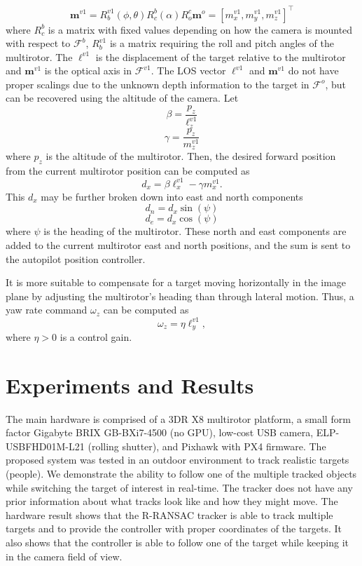 \documentclass[letterpaper, 10 pt, conference]{ieeeconf}  %
\begin{document}
\begin{equation}
\mathbf{m}^{v1}=R^{v1}_b(\phi,\theta)R^b_c(\alpha)R^c_o\mathbf{m}^o=[m^{v1}_x, m^{v1}_y, m^{v1}_z]^\top
\end{equation} where $R^b_c$ is a matrix with fixed values depending on how the camera is mounted with respect to $\mathcal{F}^b$, $R^{v1}_b$ is a matrix requiring the roll and pitch angles of the multirotor. The $\ell^{v1}$ is the displacement of the target relative to the multirotor and $\mathbf{m}^{v1}$ is the optical axis in $\mathcal{F}^{v1}$. The LOS vector $\ell^{v1}$ and $\mathbf{m}^{v1}$ do not have proper scalings due to the unknown depth information to the target in $\mathcal{F}^o$, but can be recovered using the altitude of the camera. Let
\begin{equation}
\beta=\frac{p_z}{\ell^{v1}_z}
\end{equation} 
\begin{equation}
\gamma=\frac{p_z}{m^{v1}_z}
\end{equation} where $p_z$ is the altitude of the multirotor. Then, the desired forward position from the current multirotor position can be computed as 
\begin{equation}
d_x=\beta\ell^{v1}_x-\gamma{m}^{v1}_x.
\end{equation}
This $d_x$ may be further broken down into east and north components
\begin{equation}
d_n=d_x\sin(\psi)
\end{equation}
\begin{equation}
d_e=d_x\cos(\psi)
\end{equation} where $\psi$ is the heading of the multirotor. These north and east components are added to the current multirotor east and north positions, and the sum is sent to the autopilot position controller.

It is more suitable to compensate for a target moving horizontally in the image plane by adjusting the multirotor's heading than through lateral motion. Thus, a yaw rate command $\omega_z$ can be computed as 
\begin{equation}
\omega_z=\eta \ell^{v1}_y,
\end{equation} where $\eta>0$ is a control gain.

\section{Experiments and Results}
The main hardware is comprised of a 3DR X8 multirotor platform, a small form factor Gigabyte BRIX GB-BXi7-4500 (no GPU), low-cost USB camera, ELP-USBFHD01M-L21 (rolling shutter), and Pixhawk with PX4 firmware. The proposed system was tested in an outdoor environment to track realistic targets (people). We demonstrate the ability to follow one of the multiple tracked objects while switching the target of interest in real-time. The tracker does not have any prior information about what tracks look like and how they might move. The hardware result shows that the R-RANSAC tracker is able to track multiple targets and to provide the controller with proper coordinates of the targets. It also shows that the controller is able to follow one of the target while keeping it in the camera field of view.
\end{document}
